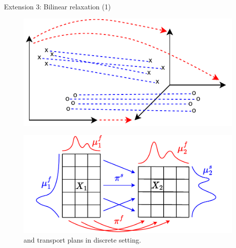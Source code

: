 \documentclass{beamer}
\begin{document}
\begin{frame}{Extension 3: Bilinear relaxation (1)}
  \begin{figure}
    \centering
    \includegraphics[width=0.7\linewidth, keepaspectratio=true]{OT_new/coot_new.pdf}
  \end{figure}

  \begin{figure}
    \centering
    \includegraphics[width=0.7\linewidth, keepaspectratio=true]{OT_new/coot_matrix_ot.pdf}
    \caption*{\scriptsize{{\color{blue}{Sample}} and {\color{red}{feature}} transport plans in discrete setting.}}
  \end{figure}

\end{frame}
\end{document}

